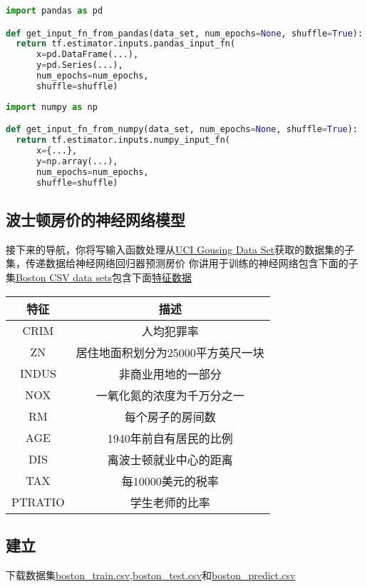 \begin{lstlisting}[language=Python]
import pandas as pd

def get_input_fn_from_pandas(data_set, num_epochs=None, shuffle=True):
  return tf.estimator.inputs.pandas_input_fn(
      x=pd.DataFrame(...),
      y=pd.Series(...),
      num_epochs=num_epochs,
      shuffle=shuffle)
\end{lstlisting}
\begin{lstlisting}[language=Python]
import numpy as np

def get_input_fn_from_numpy(data_set, num_epochs=None, shuffle=True):
  return tf.estimator.inputs.numpy_input_fn(
      x={...},
      y=np.array(...),
      num_epochs=num_epochs,
      shuffle=shuffle)
\end{lstlisting}
\subsection{波士顿房价的神经网络模型}
接下来的导航，你将写输入函数处理从\href{https://archive.ics.uci.edu/ml/datasets/Housing}{UCI Gousing Data Set}获取的数据集的子集，传递数据给神经网络回归器预测房价
你讲用于训练的神经网络包含下面的子集\href{https://www.tensorflow.org/get_started/input_fn#setup}{Boston CSV data sets}包含下面\href{https://archive.ics.uci.edu/ml/machine-learning-databases/housing/housing.names}{特征数据}\par

\begin{tabular}{|c|c|}
\hline
特征&描述\\
\hline
CRIM&人均犯罪率\\
\hline
ZN&居住地面积划分为25000平方英尺一块\\
\hline
INDUS&非商业用地的一部分\\
\hline
NOX&一氧化氮的浓度为千万分之一\\
\hline
RM&每个房子的房间数\\
\hline
AGE&1940年前自有居民的比例\\
\hline
DIS&离波士顿就业中心的距离\\
\hline
TAX&每10000美元的税率\\
\hline
PTRATIO&学生老师的比率\\
\hline
\end{tabular}
\subsection{建立}
下载数据集\href{http://download.tensorflow.org/data/boston_train.csv}{boston\_train.csv},\href{http://download.tensorflow.org/data/boston_test.csv}{boston\_test.csv}和\href{http://download.tensorflow.org/data/boston_predict.csv}{boston\_predict.csv}
